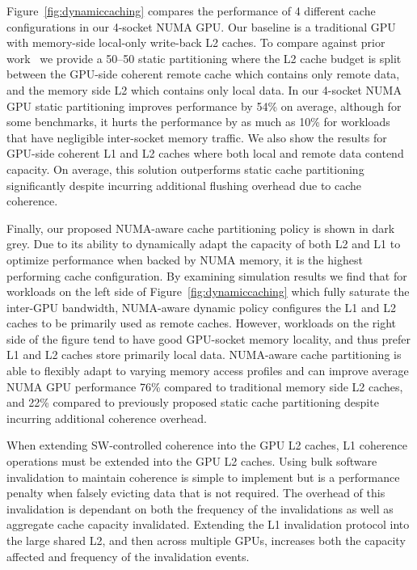 Figure~\ref{fig:dynamiccaching} compares the performance of 4 different cache
configurations in our 4-socket NUMA GPU. Our baseline is a traditional
GPU with memory-side local-only write-back L2 caches. To compare against prior work~\cite{Arunkumar2017} we
provide a 50--50 static partitioning where the L2 cache budget is split between the 
GPU-side coherent remote cache which contains only 
remote data, and the memory side L2 which contains only local data. In our 4-socket NUMA
GPU static partitioning improves performance by 54\% on average, although for some benchmarks, 
it hurts the performance by as much as 10\% for workloads that have negligible
inter-socket memory traffic. We also show the results for GPU-side
coherent L1 and L2 caches where both local and remote data contend capacity.
On average, this solution outperforms static cache partitioning significantly
despite incurring additional flushing overhead due to cache coherence.

Finally, our proposed NUMA-aware cache 
partitioning policy is shown in dark grey. Due to its ability to
dynamically adapt the capacity of both L2 and L1 to optimize performance when backed
by NUMA memory, it is the highest performing cache configuration. By examining
simulation results we find that for workloads on the left side of Figure~\ref{fig:dynamiccaching} 
which fully saturate the inter-GPU bandwidth, NUMA-aware dynamic policy configures the L1 and 
L2 caches to be primarily used as remote caches.  However, workloads on the right 
side of the figure tend to have good GPU-socket memory locality, and thus 
prefer L1 and L2 caches store primarily local data. NUMA-aware cache
partitioning is able to flexibly adapt to varying memory access profiles and
can improve average NUMA GPU performance 76\% compared to traditional memory side L2
caches, and 22\% compared to previously proposed static cache partitioning despite
incurring additional coherence overhead.

When extending SW-controlled 
coherence into the GPU L2 
caches, L1 coherence operations must be extended into the GPU 
L2 caches. Using bulk software invalidation to maintain coherence is simple to
implement but is a performance penalty when falsely evicting
data that is not required. The overhead of this
invalidation is dependant on both the frequency of the invalidations as well as aggregate cache
capacity invalidated. Extending the L1 invalidation protocol into the large shared L2, and then across
multiple GPUs, increases both the capacity affected and frequency of the invalidation events.


